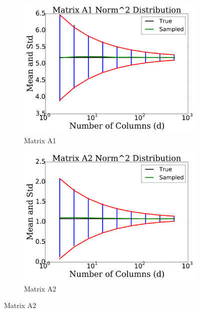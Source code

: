 
\begin{figure}[p]
    \centering

    \begin{subfigure}{0.45\textwidth}
    \includegraphics[width=\textwidth]{plots/mat_A1_error_test_2.pdf}
    \caption{Matrix A1}
    \end{subfigure}
    \begin{subfigure}{0.45\textwidth}
    \includegraphics[width=\textwidth]{plots/mat_A2_error_test_2.pdf}
    \caption{Matrix A2}
    \end{subfigure}


\end{figure}

